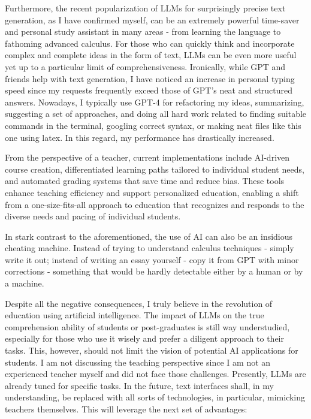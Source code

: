 \documentclass[12pt,a4paper]{article}
\begin{document}
Furthermore, the recent popularization of LLMs for surprisingly precise text generation, as I have confirmed myself, can be an extremely powerful time-saver and personal study assistant in many areas - from learning the language to fathoming advanced calculus. For those who can quickly think and incorporate complex and complete ideas in the form of text, LLMs can be even more useful yet up to a particular limit of comprehensiveness.  Ironically, while GPT and friends help with text generation, I have noticed an increase in personal typing speed since my requests frequently exceed those of GPT's neat and structured answers. Nowadays, I typically use GPT-4 for refactoring my ideas, summarizing, suggesting a set of approaches, and doing all hard work related to finding suitable commands in the terminal, googling correct syntax, or making neat files like this one using latex. In this regard, my performance has drastically increased.

From the perspective of a teacher, current implementations include AI-driven course creation, differentiated learning paths tailored to individual student needs, and automated grading systems that save time and reduce bias. These tools enhance teaching efficiency and support personalized education, enabling a shift from a one-size-fits-all approach to education that recognizes and responds to the diverse needs and pacing of individual students.

In stark contrast to the aforementioned, the use of AI can also be an insidious cheating machine. Instead of trying to understand calculus techniques - simply write it out; instead of writing an essay yourself - copy it from GPT with minor corrections - something that would be hardly detectable either by a human or by a machine. 

Despite all the negative consequences, I truly believe in the revolution of education using artificial intelligence. The impact of LLMs on the true comprehension ability of students or post-graduates is still way understudied, especially for those who use it wisely and prefer a diligent approach to their tasks. This, however, should not limit the vision of potential AI applications for students. I am not discussing the teaching perspective since I am not an experienced teacher myself and did not face those challenges. Presently, LLMs are already tuned for specific tasks. In the future, text interfaces shall, in my understanding, be replaced with all sorts of technologies, in particular, mimicking teachers themselves. This will leverage the next set of advantages:
\end{document}
